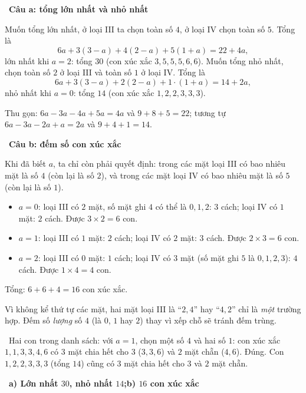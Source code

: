 \documentclass[11pt]{article}
\providecommand{\AnsWord}{Đáp số}
\newcommand{\ans}[1]{\par\smallskip{\bfseries\color{tmGreen!88!black}\AnsWord:}\ {\bfseries\color{AnsRed}#1}\par}
\newcommand{\step}[2]{\par\smallskip\noindent{\bfseries\color{tmBlue!85!black}\StepWord~#1.}\ {\bfseries #2}\par\nopagebreak}
\newcommand{\verify}[1]{\par\smallskip\noindent{\bfseries\color{tmGreen!80!black}\faCheckCircle\ \CheckWord}\ #1\par}
\def\AnsWord{Đáp số}
\def\StepWord{Bước}
\def\CheckWord{Thử lại:}
\begin{document}
{\step{2}{Câu a: tổng lớn nhất và nhỏ nhất}
Muốn tổng lớn nhất, ở loại III ta chọn toàn số $4$, ở loại IV chọn toàn số $5$. Tổng là
\[6a+3(3-a)+4(2-a)+5(1+a)=22+4a,\]
lớn nhất khi $a=2$: tổng $30$ (con xúc xắc $3,5,5,5,6,6$).
Muốn tổng nhỏ nhất, chọn toàn số $2$ ở loại III và toàn số $1$ ở loại IV. Tổng là
\[6a+3(3-a)+2(2-a)+1\cdot(1+a)=14+2a,\]
nhỏ nhất khi $a=0$: tổng $14$ (con xúc xắc $1,2,2,3,3,3$).
\begin{recallbox}Thu gọn: $6a-3a-4a+5a=4a$ và $9+8+5=22$; tương tự $6a-3a-2a+a=2a$ và $9+4+1=14$.\end{recallbox}

\step{3}{Câu b: đếm số con xúc xắc}
Khi đã biết $a$, ta chỉ còn phải quyết định: trong các mặt loại III có bao nhiêu mặt là số $4$ (còn lại là số $2$), và trong các mặt loại IV
có bao nhiêu mặt là số $5$ (còn lại là số $1$).
\begin{itemize}[leftmargin=1.2em,itemsep=1pt,topsep=2pt]
\item $a=0$: loại III có $2$ mặt, số mặt ghi $4$ có thể là $0,1,2$: $3$ cách; loại IV có $1$ mặt: $2$ cách. Được $3\times2=6$ con.
\item $a=1$: loại III có $1$ mặt: $2$ cách; loại IV có $2$ mặt: $3$ cách. Được $2\times3=6$ con.
\item $a=2$: loại III có $0$ mặt: $1$ cách; loại IV có $3$ mặt (số mặt ghi $5$ là $0,1,2,3$): $4$ cách. Được $1\times4=4$ con.
\end{itemize}
Tổng: $6+6+4=16$ con xúc xắc.
\begin{warnbox}Vì không kể thứ tự các mặt, hai mặt loại III là ``$2,4$'' hay ``$4,2$'' chỉ là \emph{một} trường hợp. Đếm số
\emph{lượng} số $4$ (là $0$, $1$ hay $2$) thay vì xếp chỗ sẽ tránh đếm trùng.\end{warnbox}
\verify{Hai con trong danh sách: với $a=1$, chọn một số $4$ và hai số $1$: con xúc xắc $1,1,3,3,4,6$ có $3$ mặt chia hết cho $3$
($3,3,6$) và $2$ mặt chẵn ($4,6$). Đúng. Con $1,2,2,3,3,3$ (tổng $14$) cũng có $3$ mặt chia hết cho $3$ và $2$ mặt chẵn.}
\ans{a) Lớn nhất $30$, nhỏ nhất $14$;\quad b) $16$ con xúc xắc}
}
\end{document}
